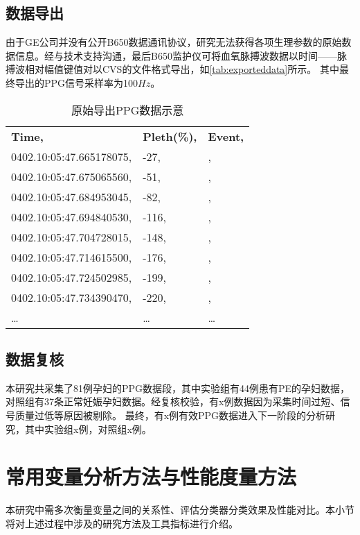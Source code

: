 \subsection{数据导出}
由于GE公司并没有公开B650数据通讯协议，研究无法获得各项生理参数的原始数据信息。经与技术支持沟通，最后B650监护仪可将血氧脉搏波数据以时间——脉搏波相对幅值键值对以CVS的文件格式导出，如\autoref{tab:exporteddata}所示。
其中最终导出的PPG信号采样率为100$Hz$。
\begin{table}[htbp]
      \centering
      \caption{\label{tab:exporteddata}原始导出PPG数据示意}
      \begin{tabularx}{\linewidth}{X<{\centering}X<{\centering}X<{\centering}}
            \rowcolor{gray!10}
            \textbf{Time,}&\textbf{Pleth(\%),}&\textbf{Event,}\\
            \rowcolor{gray!10}0402.10:05:47.665178075,&-27,&,\\
            \rowcolor{gray!10}0402.10:05:47.675065560,&-51,&,\\
            \rowcolor{gray!10}0402.10:05:47.684953045,&-82,&,\\
            \rowcolor{gray!10}0402.10:05:47.694840530,&-116,&,\\
            \rowcolor{gray!10}0402.10:05:47.704728015,&-148,&,\\
            \rowcolor{gray!10}0402.10:05:47.714615500,&-176,&,\\
            \rowcolor{gray!10}0402.10:05:47.724502985,&-199,&,\\
            \rowcolor{gray!10}0402.10:05:47.734390470,&-220,&,\\
            \rowcolor{gray!10}…&…&…\\
      \end{tabularx}
\end{table}
\subsection{数据复核}
本研究共采集了81例孕妇的PPG数据段，其中实验组有44例患有PE的孕妇数据，对照组有37条正常妊娠孕妇数据。经复核校验，有x例数据因为采集时间过短、信号质量过低等原因被剔除。
最终，有x例有效PPG数据进入下一阶段的分析研究，其中实验组x例，对照组x例。

\section{常用变量分析方法与性能度量方法}
本研究中需多次衡量变量之间的关系性、评估分类器分类效果及性能对比。本小节将对上述过程中涉及的研究方法及工具指标进行介绍。
